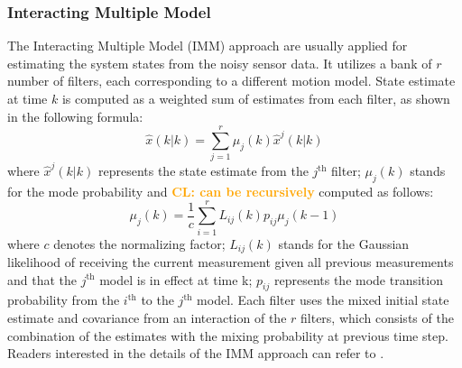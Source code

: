 \documentclass[journal]{IEEEtran}
\DeclareRobustCommand{\clnote}[1]{\ifthenelse{\boolean{include-notes}}%
	{\textcolor{orange}{\textbf{CL: #1}}}{}}
\begin{document}
	\subsubsection{Interacting Multiple Model}\label{subsec:imm}
	
	The Interacting Multiple Model (IMM) approach are usually applied for estimating the system states from the noisy sensor data.
	It utilizes a bank of $r$ number of filters, each corresponding to a different motion model.
	State estimate at time $k$ is computed as a weighted sum of estimates from each filter, as shown in the following formula:
	\small\begin{equation}
	\hat{x}(k|k)=\sum\limits_{j=1}^{r}\mu_j(k)\hat{x}^j(k|k) \label{eqn:imm_eq}
	\end{equation}\normalsize
	where $\hat{x}^j(k|k)$ represents the state estimate from the $j^\text{th}$ filter; $\mu_j(k)$ stands for the mode probability and \clnote{can be recursively} computed as follows:
	\small\[
	\mu_j(k)=\frac{1}{c}\sum\limits_{i=1}^{r}L_{ij}(k)p_{ij}\mu_j(k-1)
	\]\normalsize
	where $c$ denotes the normalizing factor; $L_{ij}(k)$ stands for the Gaussian likelihood of receiving the current measurement given all previous measurements and that the $j^\text{th}$ model is in effect at time k; $p_{ij}$ represents the mode transition probability from the $i^\text{th}$ to the $j^\text{th}$ model. 
	Each filter uses the mixed initial state estimate and covariance from an interaction of the $r$ filters, which consists of the combination of the estimates with the mixing probability at previous time step.
	Readers interested in the details of the IMM approach can refer to \cite{yaakov2001estimation}.
	
\end{document}
